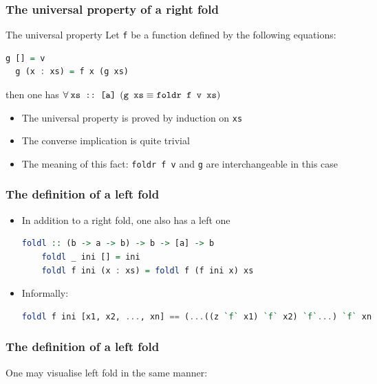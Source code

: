 \documentclass[10pt,pdf,utf8,russian,aspectratio=169]{beamer}
\begin{document}
\begin{frame}[fragile]
  \frametitle{The universal property of a right fold}
\begin{block}{The universal property}
  Let \verb"f" be a function defined by the following equations:
  \begin{lstlisting}[language=Haskell]
  g [] = v
  g (x : xs) = f x (g xs)
  \end{lstlisting}

  then one has $\forall \: \verb"xs :: [a]" \:\: (\verb"g xs" \equiv \verb"foldr f v xs")$
\end{block}
\begin{itemize}
  \item The universal property is proved by induction on \verb"xs"
  \item The converse implication is quite trivial
  \item The meaning of this fact: \verb"foldr f v" and \verb"g" are interchangeable in this case
\end{itemize}
\end{frame}

\begin{frame}[fragile]
  \frametitle{The definition of a left fold}
  \begin{itemize}
    \item In addition to a right fold, one also has a left one
    \begin{lstlisting}[language=Haskell]
    foldl :: (b -> a -> b) -> b -> [a] -> b
    foldl _ ini [] = ini
    foldl f ini (x : xs) = foldl f (f ini x) xs
    \end{lstlisting}
    \item Informally:
    \begin{lstlisting}[language=Haskell]
    foldl f ini [x1, x2, ..., xn] == (...((z `f` x1) `f` x2) `f`...) `f` xn
    \end{lstlisting}
  \end{itemize}
\end{frame}

\begin{frame}
  \frametitle{The definition of a left fold}
  One may visualise left fold in the same manner:
\end{frame}
\end{document}
